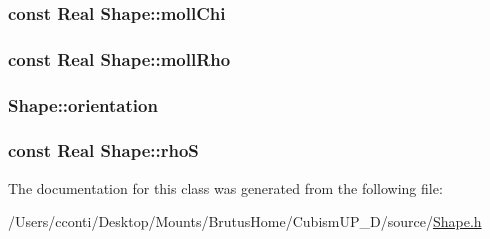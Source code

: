 \subsubsection[{moll\+Chi}]{\setlength{\rightskip}{0pt plus 5cm}const {\bf Real} Shape\+::moll\+Chi\hspace{0.3cm}{\ttfamily [protected]}}\label{class_shape_ad7d270a8ffc4056d4990424dffdd0488}
\hypertarget{class_shape_af5aa25175d49bc463fada7b11f2735e1}{}
\subsubsection[{moll\+Rho}]{\setlength{\rightskip}{0pt plus 5cm}const {\bf Real} Shape\+::moll\+Rho\hspace{0.3cm}{\ttfamily [protected]}}\label{class_shape_af5aa25175d49bc463fada7b11f2735e1}
\hypertarget{class_shape_a1778439509ada1f3fa64472610221d19}{}
\subsubsection[{orientation}]{ Shape\+::orientation\hspace{0.3cm}{\ttfamily [protected]}}\label{class_shape_a1778439509ada1f3fa64472610221d19}
\hypertarget{class_shape_a181acdc3063f20a15ba1807f7b6a5d10}{}
\subsubsection[{rho\+S}]{\setlength{\rightskip}{0pt plus 5cm}const {\bf Real} Shape\+::rho\+S\hspace{0.3cm}{\ttfamily [protected]}}\label{class_shape_a181acdc3063f20a15ba1807f7b6a5d10}


The documentation for this class was generated from the following file\+:\begin{DoxyCompactItemize}
\item 
/\+Users/cconti/\+Desktop/\+Mounts/\+Brutus\+Home/\+Cubism\+U\+P\+\_\+D/source/\hyperlink{_shape_8h}{Shape.\+h}\end{DoxyCompactItemize}
